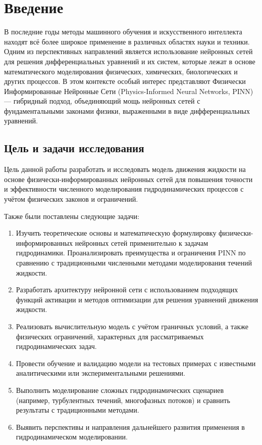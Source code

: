 \chapter{Введение}

В последние годы методы машинного обучения и искусственного интеллекта находят всё
более широкое применение в различных областях науки и техники. Одним из перспективных
направлений является использование нейронных сетей для решения дифференциальных
уравнений и их систем, которые лежат в основе математического моделирования физических,
химических, биологических и других процессов. В этом контексте особый интерес представляют
Физически Информированные Нейронные Сети (Physics-Informed Neural Networks, PINN) ---
гибридный подход, объединяющий мощь нейронных сетей с фундаментальными законами физики,
выраженными в виде дифференциальных уравнений.

\section{Цель и задачи исследования}
Цель данной работы разработать и исследовать модель движения жидкости на основе
физически-информированных нейронных сетей для повышения точности и эффективности
численного моделирования гидродинамических процессов с учётом физических законов
и ограничений.

Также были поставлены следующие задачи:
\begin{enumerate}
    \item Изучить теоретические основы и математическую формулировку физически-информированных
    нейронных сетей применительно к задачам гидродинамики.
    Проанализировать преимущества и ограничения PINN по сравнению с традиционными численными
    методами моделирования течений жидкости.
    
    \item Разработать архитектуру нейронной сети с использованием подходящих функций активации и
    методов оптимизации для решения уравнений движения жидкости.
    
    \item Реализовать вычислительную модель с учётом граничных условий, а также
    физических ограничений, характерных для рассматриваемых гидродинамических задач.
    
    \item Провести обучение и валидацию модели на тестовых примерах с известными аналитическими
    или экспериментальными решениями.
    
    \item Выполнить моделирование сложных гидродинамических сценариев (например, турбулентных
    течений, многофазных потоков) и сравнить результаты с традиционными методами.
    
    \item Выявить перспективы и направления дальнейшего развития применения  в
    гидродинамическом моделировании.
\end{enumerate}
